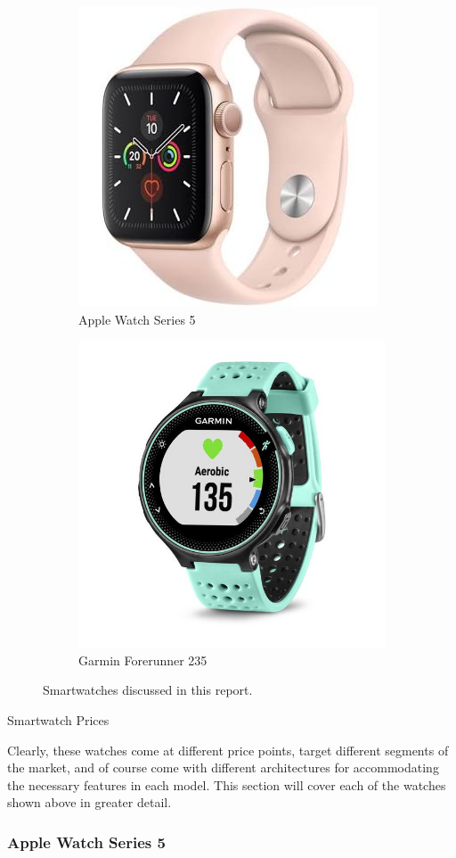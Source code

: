 \begin{figure}[h]
    \centering
    \begin{subfigure}{.5\textwidth}
      \centering
      \includegraphics[width=.4\linewidth]{media/apple_pic.jpeg}
      \caption{Apple Watch Series 5 \cite{apple_price}}
      \label{fig:sub1}
    \end{subfigure}%
    \begin{subfigure}{.5\textwidth}
        \centering
        \includegraphics[width=.4\linewidth]{media/garmin_pic.jpeg}
        \caption{Garmin Forerunner 235 \cite{garmin_price}}
        \label{fig:sub3}
      \end{subfigure}
    \caption{Smartwatches discussed in this report.}
    \label{watches:pictures}
\end{figure}

\begin{table}[h]
    \centering
    \caption{Smartwatch Prices}
    \label{watch:price} 
\end{table}

Clearly, these watches come at different price points, target different segments of the market, and
of course come with different architectures for accommodating the necessary features in each model. This
section will cover each of the watches shown above in greater detail.

\subsubsection{Apple Watch Series 5}
